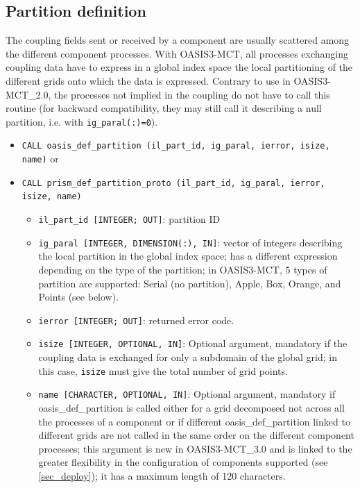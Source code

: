 \subsection{Partition definition}
\label{subsubsec_Partition}

The coupling fields sent or received by a component are usually
scattered among the different component processes. With OASIS3-MCT,
all processes exchanging coupling data have to express in a global index space the local
partitioning of the different grids onto which the data is expressed.
Contrary to use in OASIS3-MCT\_2.0, the processes not implied in the
coupling do not have to call this routine (for backward compatibility,
they may still call it describing a null partition, i.e. with {\tt ig\_paral(:)=0}).

\begin{itemize}

  \vspace{0.2cm}
\item {\tt CALL oasis\_def\_partition (il\_part\_id, ig\_paral,
    ierror, isize, name)} or
\item {\tt CALL prism\_def\_partition\_proto (il\_part\_id, ig\_paral,
    ierror, isize, name)}

  \begin{itemize}
  \item {\tt il\_part\_id [INTEGER; OUT]}: partition ID
  \item {\tt ig\_paral [INTEGER, DIMENSION(:), IN]}: vector of
    integers describing the local partition in the global index space;
    has a different expression depending on the type of the partition;
    in OASIS3-MCT, 5 types of partition are supported: Serial (no
    partition), Apple, Box, Orange, and Points (see below).
  \item {\tt ierror [INTEGER; OUT]}: returned error code.
  \item {\tt isize [INTEGER, OPTIONAL, IN]}: Optional argument, mandatory
    if the coupling data is exchanged for only a subdomain of the
    global grid; in this case, {\tt isize} must give the total number of grid points.

  \item {\tt name [CHARACTER, OPTIONAL, IN]}: Optional argument,
    mandatory if oasis\_def\_partition is called either for a grid
    decomposed not across all the processes of a component or if
    different oasis\_def\_partition linked to different grids are not
    called in the same order on the different component processes;
    this argument is new in OASIS3-MCT\_3.0 and is linked to the
    greater flexibility in the configuration of components supported
    (see \ref{sec_deploy}); it has a maximum length of 120 characters. 
  \end{itemize}
\end{itemize}

